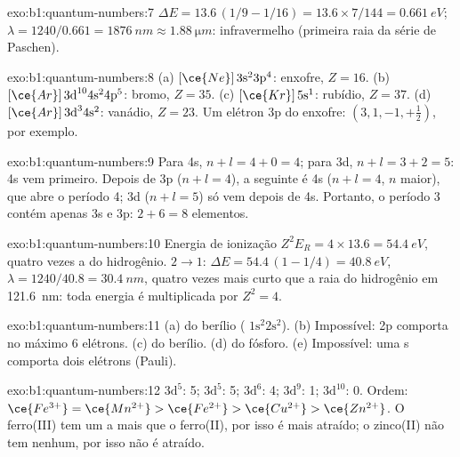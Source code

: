 \begin{solution}{exo:b1:quantum-numbers:7}
$\Delta E = 13.6\,(1/9 - 1/16) = 13.6 \times 7/144 = \qty{0.661}{eV}$;
$\lambda = 1240/0.661 = \qty{1876}{nm} \approx \qty{1.88}{\micro m}$:
infravermelho (primeira raia da série de Paschen).
\end{solution}

\begin{solution}{exo:b1:quantum-numbers:8}
(a) $[\ce{Ne}]\,3\text{s}^2 3\text{p}^4$: enxofre, $Z = 16$.
(b) $[\ce{Ar}]\,3\text{d}^{10} 4\text{s}^2 4\text{p}^5$: bromo, $Z = 35$.
(c) $[\ce{Kr}]\,5\text{s}^1$: rubídio, $Z = 37$.
(d) $[\ce{Ar}]\,3\text{d}^3 4\text{s}^2$: vanádio, $Z = 23$.
Um elétron 3p do enxofre: $(3, 1, -1, +\tfrac12)$, por exemplo.
\end{solution}

\begin{solution}{exo:b1:quantum-numbers:9}
Para 4s, $n + l = 4 + 0 = 4$; para 3d, $n + l = 3 + 2 = 5$: 4s vem
primeiro. Depois de 3p ($n + l = 4$), a  seguinte é 4s ($n + l = 4$, $n$
maior), que abre o período 4; 3d ($n + l = 5$) só vem depois de 4s.
Portanto, o período 3 contém apenas 3s e 3p: $2 + 6 = 8$ elementos.
\end{solution}

\begin{solution}{exo:b1:quantum-numbers:10}
Energia de ionização $Z^2E_R = 4 \times 13.6 = \qty{54.4}{eV}$, quatro vezes
a do hidrogênio. $2 \to 1$: $\Delta E = 54.4\,(1 - 1/4) = \qty{40.8}{eV}$,
$\lambda = 1240/40.8 = \qty{30.4}{nm}$, quatro vezes mais curto que a
raia do hidrogênio em \qty{121.6}{nm}: toda energia é multiplicada por $Z^2 = 4$.
\end{solution}

\begin{solution}{exo:b1:quantum-numbers:11}
(a)  do berílio ( $1\text{s}^2 2\text{s}^2$).
(b) Impossível: 2p comporta no máximo 6 elétrons. (c)  do
berílio. (d)  do fósforo. (e) Impossível: uma  s
comporta dois elétrons (Pauli).
\end{solution}

\begin{solution}{exo:b1:quantum-numbers:12}
 $3\text{d}^5$: 5;  $3\text{d}^5$: 5; 
$3\text{d}^6$: 4;  $3\text{d}^9$: 1; 
$3\text{d}^{10}$: 0. Ordem: $\ce{Fe^{3+}} = \ce{Mn^{2+}} > \ce{Fe^{2+}}
> \ce{Cu^{2+}} > \ce{Zn^{2+}}$. O ferro(III) tem um 
a mais que o ferro(II), por isso é mais atraído; o zinco(II) não tem
nenhum, por isso não é atraído.
\end{solution}

